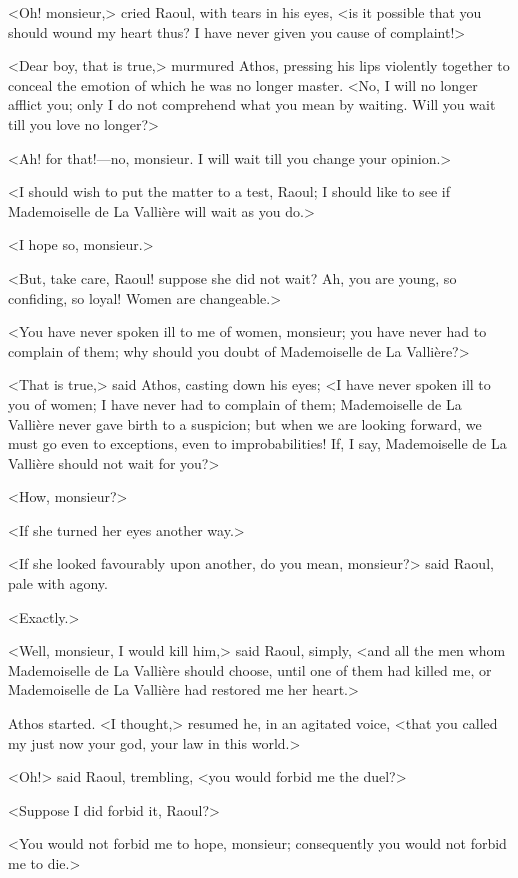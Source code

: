 <Oh! monsieur,> cried Raoul, with tears in his eyes, <is it possible that you should wound my heart thus? I have never given you cause of complaint!>

<Dear boy, that is true,> murmured Athos, pressing his lips violently together to conceal the emotion of which he was no longer master. <No, I will no longer afflict you; only I do not comprehend what you mean by waiting. Will you wait till you love no longer?>

<Ah! for that!—no, monsieur. I will wait till you change your opinion.>

<I should wish to put the matter to a test, Raoul; I should like to see if Mademoiselle de La Vallière will wait as you do.>

<I hope so, monsieur.>

<But, take care, Raoul! suppose she did not wait? Ah, you are young, so confiding, so loyal! Women are changeable.>

<You have never spoken ill to me of women, monsieur; you have never had to complain of them; why should you doubt of Mademoiselle de La Vallière?>

<That is true,> said Athos, casting down his eyes; <I have never spoken ill to you of women; I have never had to complain of them; Mademoiselle de La Vallière never gave birth to a suspicion; but when we are looking forward, we must go even to exceptions, even to improbabilities! If, I say, Mademoiselle de La Vallière should not wait for you?>

<How, monsieur?>

<If she turned her eyes another way.>

<If she looked favourably upon another, do you mean, monsieur?> said Raoul, pale with agony.

<Exactly.>

<Well, monsieur, I would kill him,> said Raoul, simply, <and all the men whom Mademoiselle de La Vallière should choose, until one of them had killed me, or Mademoiselle de La Vallière had restored me her heart.>

Athos started. <I thought,> resumed he, in an agitated voice, <that you called my just now your god, your law in this world.>

<Oh!> said Raoul, trembling, <you would forbid me the duel?>

<Suppose I did forbid it, Raoul?>

<You would not forbid me to hope, monsieur; consequently you would not forbid me to die.>

